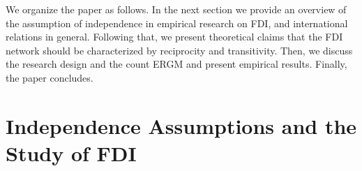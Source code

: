 \documentclass[reqno,onecolumn,letterpaper,12pt]{article}
\begin{document}



We organize the paper as follows. In the next section we provide an overview of the assumption of independence in empirical research on FDI, and international relations in general. Following that, we present theoretical claims that the FDI network should be characterized by reciprocity and transitivity. Then, we discuss the research design and the count ERGM and present empirical results. Finally, the paper concludes. 








\section{Independence Assumptions and the Study of FDI}
\end{document}
